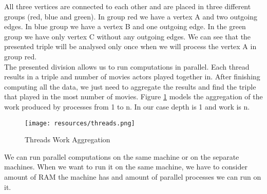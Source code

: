 All three vertices are connected to each other and are placed in three different groups (red, blue and green). In group red we have a vertex A and two outgoing edges. In blue group we have a vertex B and one outgoing edge. In the green group we have only vertex C without any outgoing edges. We can see that the presented triple will be analysed only once when we will process the vertex A in group red.
\\
The presented division allows us to run computations in parallel. Each thread results in a triple and number of movies actors played together in. After finishing computing all the data, we just need to aggregate the results and find the triple that played in the most number of movies. Figure \ref{threads} models the aggregation of the work produced by processes from 1 to n. In our case depth is 1 and work is n.


\begin{figure}[ht!]
\centering
\texttt{[image: resources/threads.png]}
\caption{Threads Work Aggregation}
\label{threads}
\end{figure}

We can run parallel computations on the same machine or on the separate machines. When we want to run it on the same machine, we have to consider amount of RAM the machine has and amount of parallel processes we can run on it.

